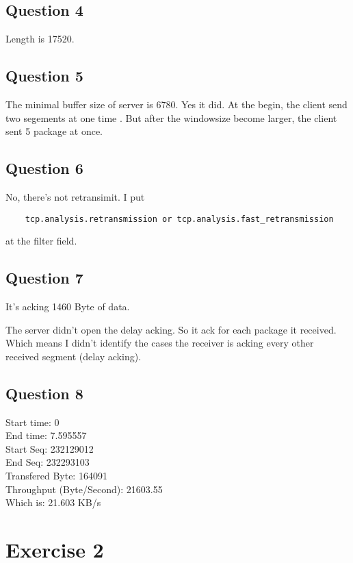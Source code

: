 \documentclass{article}
\begin{document}
\subsection{Question 4}

Length is 17520.

\subsection{Question 5}

The minimal buffer size of server is 6780.
Yes it did. At the begin, the client send two segements at one time .
But after the windowsize become larger, the client sent 5 package at once.

\subsection{Question 6}

No, there's not retransimit. I put 
\begin{lstlisting}
    tcp.analysis.retransmission or tcp.analysis.fast_retransmission
\end{lstlisting}
at the filter field.

\subsection{Question 7}

It's acking 1460 Byte of data. 

The server didn't open the delay acking. So it ack for each package it received.
Which means I didn't identify the cases the receiver is acking every other received segment 
(delay acking).

\subsection{Question 8}

Start time: 0\\
End time: 7.595557\\
Start Seq: 232129012\\
End Seq: 232293103\\
Transfered Byte: 164091\\
Throughput (Byte/Second): 21603.55\\
Which is: 21.603 KB/s\\

\section{Exercise 2}
\end{document}
